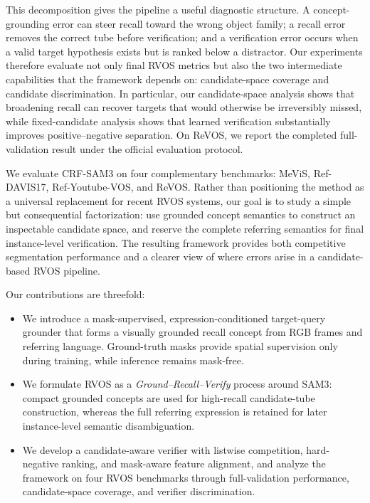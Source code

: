 This decomposition gives the pipeline a useful diagnostic structure. A concept-grounding error can steer recall toward the wrong object family; a recall error removes the correct tube before verification; and a verification error occurs when a valid target hypothesis exists but is ranked below a distractor. Our experiments therefore evaluate not only final RVOS metrics but also the two intermediate capabilities that the framework depends on: candidate-space coverage and candidate discrimination. In particular, our candidate-space analysis shows that broadening recall can recover targets that would otherwise be irreversibly missed, while fixed-candidate analysis shows that learned verification substantially improves positive--negative separation. On ReVOS, we report the completed full-validation result under the official evaluation protocol.

We evaluate CRF-SAM3 on four complementary benchmarks: MeViS, Ref-DAVIS17, Ref-Youtube-VOS, and ReVOS. Rather than positioning the method as a universal replacement for recent RVOS systems, our goal is to study a simple but consequential factorization: use grounded concept semantics to construct an inspectable candidate space, and reserve the complete referring semantics for final instance-level verification. The resulting framework provides both competitive segmentation performance and a clearer view of where errors arise in a candidate-based RVOS pipeline.

Our contributions are threefold:
\begin{itemize}
    \item We introduce a mask-supervised, expression-conditioned target-query grounder that forms a visually grounded recall concept from RGB frames and referring language. Ground-truth masks provide spatial supervision only during training, while inference remains mask-free.
    \item We formulate RVOS as a \emph{Ground--Recall--Verify} process around SAM3: compact grounded concepts are used for high-recall candidate-tube construction, whereas the full referring expression is retained for later instance-level semantic disambiguation.
    \item We develop a candidate-aware verifier with listwise competition, hard-negative ranking, and mask-aware feature alignment, and analyze the framework on four RVOS benchmarks through full-validation performance, candidate-space coverage, and verifier discrimination.
\end{itemize}
